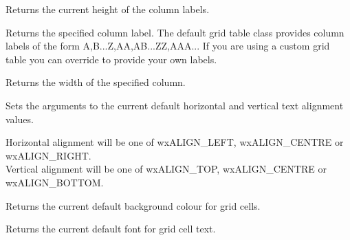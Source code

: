 
\label{wxgridgetcollabelsize}


Returns the current height of the column labels.

\label{wxgridgetcollabelvalue}


Returns the specified column label. The default grid table class provides column labels of
the form A,B...Z,AA,AB...ZZ,AAA... If you are using a custom grid table you can override 
 to provide
your own labels. 

\label{wxgridgetcolsize}


Returns the width of the specified column.

\label{wxgridgetdefaultcellalignment}


Sets the arguments to the current default horizontal and vertical text alignment
values.

Horizontal alignment will be one of wxALIGN\_LEFT, wxALIGN\_CENTRE or wxALIGN\_RIGHT. \\
Vertical alignment will be one of wxALIGN\_TOP, wxALIGN\_CENTRE or wxALIGN\_BOTTOM.

\label{wxgridgetdefaultcellbackgroundcolour}


Returns the current default background colour for grid cells.

\label{wxgridgetdefaultcellfont}


Returns the current default font for grid cell text.

\label{wxgridgetdefaultcelltextcolour}

